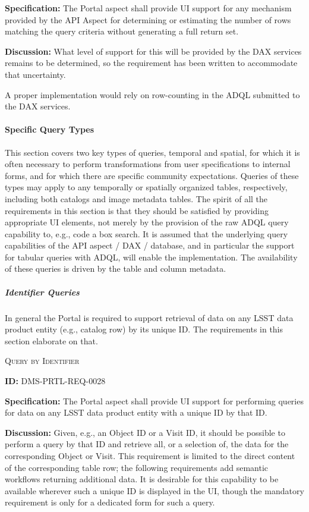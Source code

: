 \documentclass[SE,toc]{lsstdoc}
\begin{document}
\textbf{Specification:}
The Portal aspect shall provide UI support for any mechanism provided by the API Aspect for determining or estimating the number of rows matching the query criteria without generating a full return set.

\textbf{Discussion:}
What level of support for this will be provided by the DAX services remains to be determined, so the requirement has been written to accommodate that uncertainty.

A proper implementation would rely on row-counting in the ADQL submitted to the DAX services.

\paragraph{Specific Query Types}\hfill  %

This section covers two key types of queries, temporal and spatial, for which it is often necessary to perform transformations from user specifications to internal forms, and for which there are specific community expectations.
Queries of these types may apply to any temporally or spatially organized tables, respectively, including both catalogs and image metadata tables.
The spirit of all the requirements in this section is that they should be satisfied by providing appropriate UI elements, not merely by the provision of the raw ADQL query capability to, e.g., code a box search.
It is assumed that the underlying query capabilities of the API aspect / DAX / database, and in particular the support for tabular queries with ADQL, will enable the implementation.
The availability of these queries is driven by the table and column metadata.

\subparagraph{Identifier Queries}\hfill  %

In general the Portal is required to support retrieval of data on any LSST data product entity (e.g., catalog row) by its unique ID.  The requirements in this section elaborate on that.

\textsc{Query by Identifier}

\label{DMS-PRTL-REQ-0028}
\textbf{ID:} DMS-PRTL-REQ-0028

\textbf{Specification:}
The Portal aspect shall provide UI support for performing queries for data on any LSST data product entity with a unique ID by that ID.

\textbf{Discussion:}
Given, e.g., an Object ID or a Visit ID, it should be possible to perform a query by that ID and retrieve all, or a selection of, the data for the corresponding Object or Visit.  This requirement is limited to the direct content of the corresponding table row; the following requirements add semantic workflows returning additional data.
It is desirable for this capability to be available wherever such a unique ID is displayed in the UI, though the mandatory requirement is only for a dedicated form for such a query.
\end{document}
